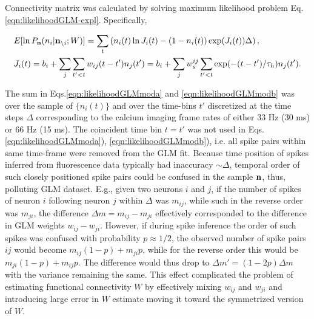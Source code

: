 Connectivity matrix was calculated by solving maximum likelihood problem Eq. \eqref{eqn:likelihoodGLM-expl}. Specifically, 

\begin{align}
\label{eqn:likelihoodGLMmoda}&E[\ln P_{{\bf n}}(n_i|{\bf n}_{\backslash i}; W)]=\sum_t \left( n_i(t) \ln J_i(t) - (1-n_i(t)) \exp(J_i(t)) \Delta \right), \\
\label{eqn:likelihoodGLMmodb}&J_i(t)=b_i+\sum\limits_j \sum\limits_{t'<t} w_{ij}(t-t')n_{j}(t')=
b_i+\sum\limits_j w^{ij}_s \sum\limits_{t'<t} \exp(-(t-t')/\tau_h)n_j(t').
\end{align}

The sum in Eqs.\eqref{eqn:likelihoodGLMmoda} and \eqref{eqn:likelihoodGLMmodb} was over the sample of $\{n_i(t)\}$ and over the time-bins $t'$ discretized at the time steps $\Delta$ corresponding to the calcium imaging frame rates of either 33 Hz (30 ms) or 66 Hz (15 ms). The coincident time bin $t=t'$ was not used in Eqs.\eqref{eqn:likelihoodGLMmoda}), \eqref{eqn:likelihoodGLMmodb}), i.e.  all spike pairs within same time-frame were removed from the GLM fit.  Because time position of spikes inferred from fluorescence data typically had inaccuracy $\sim \Delta$, temporal order of such closely positioned spike pairs could be confused in the sample ${\bf n}$, thus, polluting GLM dataset.  E.g., given two neurons $i$ and $j$, if the number of spikes of neuron $i$ following neuron $j$ within $\Delta$ was $m_{ij}$, while such in the reverse order was $m_{ji}$, the difference $\Delta m = m_{ij}-m_{ji}$ effectively corresponded to the difference in GLM weights $w_{ij}-w_{ji}$. However, if during spike inference the order of such spikes was confused with probability $p\approx 1/2$, the observed number of spike pairs $ij$ would become $m_{ij}(1-p)+m_{ji}p$, while for the reverse order this would be $m_{ji}(1-p)+m_{ij}p$. The difference would thus drop to $\Delta m '= (1-2p)\Delta m$ with the variance remaining the same. This effect complicated the problem of estimating functional connectivity $W$ by effectively mixing $w_{ij}$ and $w_{ji}$ and introducing large error in $W$ estimate moving it toward the symmetrized version of $W$.

